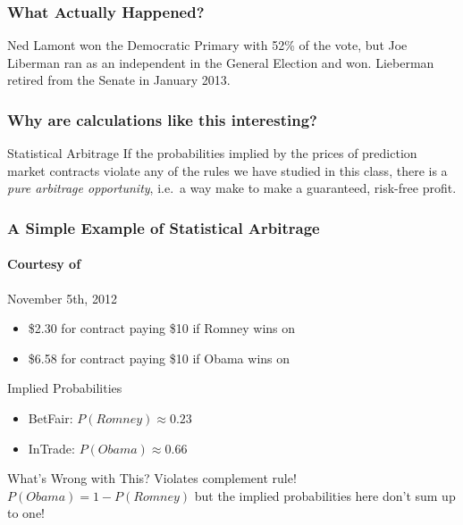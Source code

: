 \documentclass[handout]{beamer}
\begin{document}
\begin{frame}
\frametitle{What Actually Happened?}

Ned Lamont won the Democratic Primary with 52\% of the vote, but Joe Liberman ran as an independent in the General Election and won. Lieberman retired from the Senate in January 2013.

\end{frame}
\begin{frame}
\frametitle{Why are calculations like this interesting?}
	\begin{alertblock}{Statistical Arbitrage}
	If the probabilities implied by the prices of prediction market contracts violate any of the rules we have studied in this class, there is a \emph{pure arbitrage opportunity}, i.e.\ a way make to make a guaranteed, risk-free profit.
	\end{alertblock}
\end{frame}
\begin{frame}
\frametitle{A Simple Example of Statistical Arbitrage}
\framesubtitle{Courtesy of  }

\begin{block}{November 5th, 2012}\pause
	\begin{itemize}
		\item\$2.30 for contract paying \$10 if Romney wins on  	\pause
		\item \$6.58 for contract paying \$10 if Obama wins on  \pause
	\end{itemize}
\end{block}

\begin{block}{Implied Probabilities}
	\begin{itemize}\pause
	\item BetFair: $P(Romney) \approx 0.23$\pause
	\item InTrade: $P(Obama) \approx 0.66$\pause
	\end{itemize}
\end{block}

\begin{alertblock}{What's Wrong with This?}\pause
 Violates complement rule! $P(Obama) = 1 - P(Romney)$ but the implied probabilities here don't sum up to one!
\end{alertblock}



\end{frame}
\end{document}
